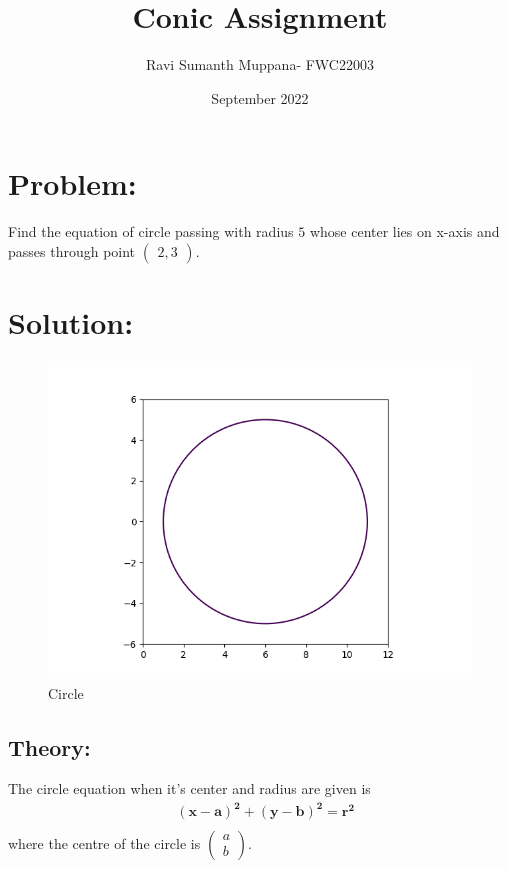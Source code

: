 \documentclass[a4paper,12pt,twocolumn]{article}
\title{Conic Assignment}
\author{Ravi Sumanth Muppana- FWC22003}
\date{September 2022}
\let\vec\mathbf
\newcommand{\myvec}[1]{\ensuremath{\begin{pmatrix}#1\end{pmatrix}}}
\begin{document}
\maketitle
\section{Problem:}
Find the equation of circle passing with radius $5$ whose center lies on x-axis and passes through point $\myvec{2,3}$.
\maketitle
\section{Solution:}
\begin{figure}[h]
	\includegraphics[width=\linewidth]{conic.png}
\caption{Circle}
\end{figure}
\subsection{Theory:}
The circle equation when it's center and radius are given is
\begin{align}
	&\vec{(x-a)^2} + \vec{(y-b)^2} = \vec{r^2}\\
\end{align}
where the centre of the circle is $\myvec{a\\b}$.
\end{document}
